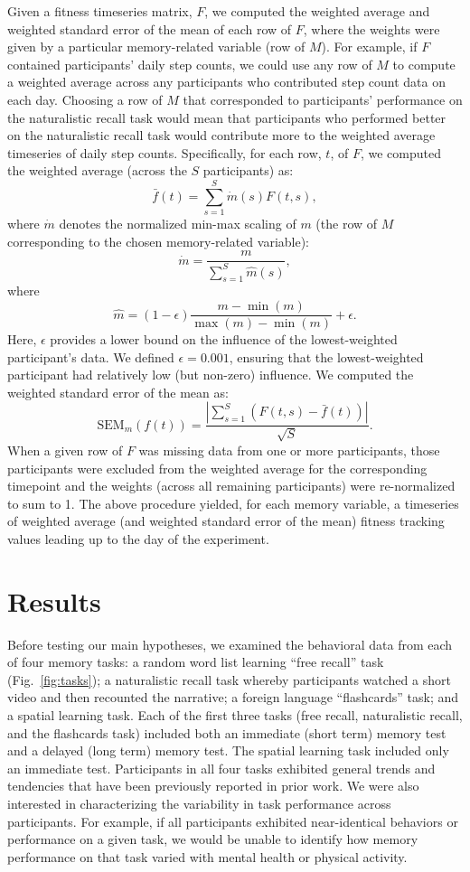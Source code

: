 \documentclass[10pt]{article}
\begin{document}
Given a fitness timeseries matrix, $F$, we computed the weighted
average and weighted standard error of the mean of each row of $F$,
where the weights were given by a particular memory-related variable
(row of $M$).  For example, if $F$ contained participants' daily step
counts, we could use any row of $M$ to compute a weighted average
across any participants who contributed step count data on each day.
Choosing a row of $M$ that corresponded to participants' performance
on the naturalistic recall task would mean that participants who
performed better on the naturalistic recall task would contribute more
to the weighted average timeseries of daily step counts.
Specifically, for each row, $t$, of $F$, we computed the weighted
average (across the $S$ participants) as:
\[
\bar{f}(t) = \sum_{s=1}^S \dot{m}(s) F(t, s),
\]
where $\dot{m}$ denotes the normalized min-max scaling of $m$ (the row
of $M$ corresponding to the chosen memory-related variable):
\[
  \dot{m} = \frac{m}{\sum_{s=1}^S \hat{m}(s)},
\]
where
\[
  \hat{m} = (1 - \epsilon)\frac{m - \min(m)}{\max(m) - \min(m)} + \epsilon.
\]
Here, $\epsilon$ provides a lower bound on the influence of the
lowest-weighted participant's data.  We defined $\epsilon = 0.001$,
ensuring that the lowest-weighted participant had relatively low (but
non-zero) influence.  We computed the weighted standard error of the
mean as:
\[
\mathrm{SEM}_m\left(f(t)\right) = \frac{\left| \sum_{s=1}^S \left( F(t, s) -
    \bar{f}(t)\right) \right|}{\sqrt{S}}.
\]
When a given row of $F$ was missing data from one or more
participants, those participants were excluded from the weighted
average for the corresponding timepoint and the weights (across all
remaining participants) were re-normalized to sum to 1.  The above
procedure yielded, for each memory variable, a timeseries of weighted
average (and weighted standard error of the mean) fitness tracking
values leading up to the day of the experiment.

\section*{Results}
Before testing our main hypotheses, we examined the behavioral data
from each of four memory tasks: a random word list learning ``free
recall'' task (Fig.~\ref{fig:tasks}); a naturalistic recall task whereby participants watched
a short video and then recounted the narrative; a foreign language
``flashcards'' task; and a spatial learning task.  Each of the first
three tasks (free recall, naturalistic recall, and the flashcards
task) included both an immediate (short term) memory test and a
delayed (long term) memory test.  The spatial learning task included
only an immediate test. Participants in all four tasks exhibited
general trends and tendencies that have been previously reported in
prior work.  We were also interested in characterizing the variability
in task performance across participants.  For example, if all
participants exhibited near-identical behaviors or performance on a
given task, we would be unable to identify how memory performance on
that task varied with mental health or physical activity.
\end{document}
